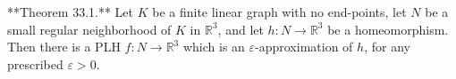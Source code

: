 **Theorem 33.1.** Let $K$ be a finite linear graph with no end-points, let $N$ be a small regular neighborhood of $K$ in $\mathbb{R}^3$, and let $h: N \to \mathbb{R}^3$ be a homeomorphism. Then there is a PLH $f: N \to \mathbb{R}^3$ which is an $\varepsilon$-approximation of $h$, for any prescribed $\varepsilon > 0$.
